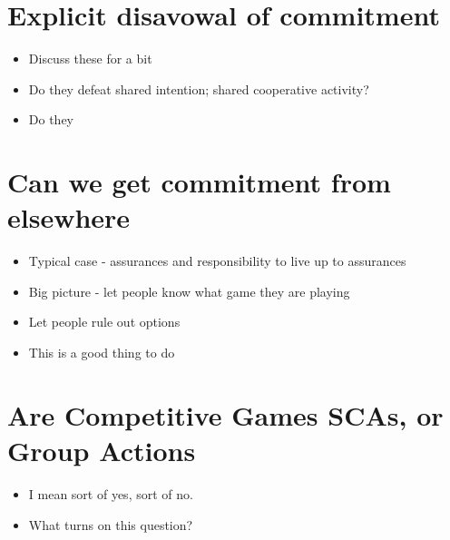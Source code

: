 \documentclass[11pt,]{article}
\providecommand{\tightlist}{%
  \setlength{\itemsep}{0pt}\setlength{\parskip}{0pt}}
\begin{document}
\hypertarget{explicit-disavowal-of-commitment}{%
\section{Explicit disavowal of
commitment}\label{explicit-disavowal-of-commitment}}

\begin{itemize}
\tightlist
\item
  Discuss these for a bit
\item
  Do they defeat shared intention; shared cooperative activity?
\item
  Do they
\end{itemize}

\hypertarget{can-we-get-commitment-from-elsewhere}{%
\section{Can we get commitment from
elsewhere}\label{can-we-get-commitment-from-elsewhere}}

\begin{itemize}
\tightlist
\item
  Typical case - assurances and responsibility to live up to assurances
\item
  Big picture - let people know what game they are playing
\item
  Let people rule out options
\item
  This is a good thing to do
\end{itemize}

\hypertarget{are-competitive-games-scas-or-group-actions}{%
\section{Are Competitive Games SCAs, or Group
Actions}\label{are-competitive-games-scas-or-group-actions}}

\begin{itemize}
\tightlist
\item
  I mean sort of yes, sort of no.
\item
  What turns on this question?
\end{itemize}
\end{document}
